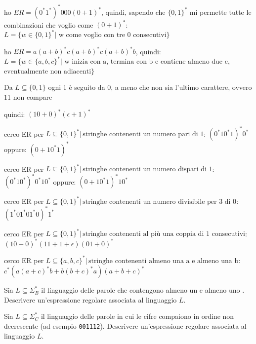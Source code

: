 \begin{example}
	ho $ER=(0^*1^*)^*000(0+1)^*$, quindi, sapendo che $\{0,1\}^*$ mi permette tutte le combinazioni che voglio come $(0+1)^*$:
	$L=\{w\in\{0,1\}^*|\text{ w come voglio con tre 0 consecutivi}\}$
\end{example}
\begin{example}
	ho $ER=a(a+b)^*c(a+b)^*c(a+b)^*b$, quindi:
	$L=\{w\in\{a,b,c\}^*|\text{ w inizia con a, termina con b  e contiene almeno due c, }$
	$\text{eventualmente non adiacenti}\}$
\end{example}
\begin{example}
Da $L\subseteq\{0,1\}$
 ogni 1 è seguito da 0, a meno che non sia l'ultimo carattere, ovvero 11 non compare

	quindi:
	$(10+0)^*(\epsilon+1)^*$
\end{example}
\begin{example}
	cerco ER per $L\subseteq\{0,1\}^*|\, \text{stringhe contenenti un numero pari di 1}$:
	$(0^*10^*1)^*0^*$
	oppure:
	$(0+10^*1)^*$
\end{example}
\begin{example}
	cerco ER per $L\subseteq\{0,1\}^*|\, \text{stringhe contenenti un numero dispari di 1}$:
	$(0^*10^*)^*0^*10^*$
	oppure:
	$(0+10^*1)^*10^*$
\end{example}
\begin{example}
	cerco ER per $L\subseteq\{0,1\}^*|\, \text{stringhe contenenti un numero divisibile per 3 di 0}$:
	$(1^*01^*01^*0)^*1^*$
\end{example}
\begin{example}
	cerco ER per $L\subseteq\{0,1\}^*|\, \text{stringhe contenenti al più una coppia di 1 consecutivi}$:
	$(10+0)^*(11+1+\epsilon)(01+0)^*$
\end{example}
\begin{example}
	cerco ER per $L\subseteq\{a,b,c\}^*|\, \text{stringhe contenenti almeno una a e almeno una b}:$
	$c^*\left(a(a+c)^*b+b(b+c)^*a\right)(a+b+c)^*$
\end{example}

\begin{Exercise}[label=0e1-er]
Sia $L\subseteq \Sigma_{B}^{*}$ il linguaggio delle parole che contengono almeno un \uno e almeno uno \zero.
Descrivere un'espressione regolare associata al linguaggio $L$.
\end{Exercise}



\begin{Exercise}[label=re-crescente]
Sia $L\subseteq \Sigma_{C}^{*}$ il linguaggio delle parole in cui le cifre compaiono in ordine non decrescente (ad esempio
\texttt{001112}).
Descrivere un'espressione regolare associata al linguaggio $L$.
\end{Exercise}


